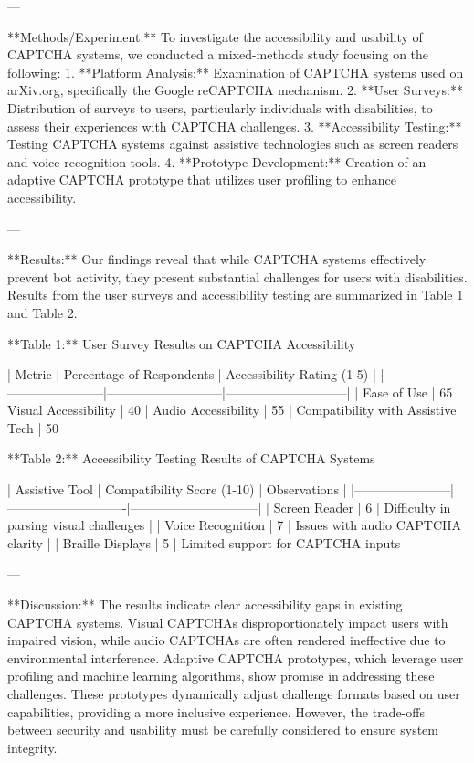---

**Methods/Experiment:**  
To investigate the accessibility and usability of CAPTCHA systems, we conducted a mixed-methods study focusing on the following:  
1. **Platform Analysis:** Examination of CAPTCHA systems used on arXiv.org, specifically the Google reCAPTCHA mechanism.  
2. **User Surveys:** Distribution of surveys to users, particularly individuals with disabilities, to assess their experiences with CAPTCHA challenges.  
3. **Accessibility Testing:** Testing CAPTCHA systems against assistive technologies such as screen readers and voice recognition tools.  
4. **Prototype Development:** Creation of an adaptive CAPTCHA prototype that utilizes user profiling to enhance accessibility.

---

**Results:**  
Our findings reveal that while CAPTCHA systems effectively prevent bot activity, they present substantial challenges for users with disabilities. Results from the user surveys and accessibility testing are summarized in Table 1 and Table 2.

**Table 1:** User Survey Results on CAPTCHA Accessibility  

| Metric                | Percentage of Respondents | Accessibility Rating (1-5) |  
|-----------------------|---------------------------|-----------------------------|  
| Ease of Use           | 65%
| Visual Accessibility  | 40%
| Audio Accessibility   | 55%
| Compatibility with Assistive Tech | 50%

**Table 2:** Accessibility Testing Results of CAPTCHA Systems  

| Assistive Tool        | Compatibility Score (1-10) | Observations                  |  
|-----------------------|----------------------------|------------------------------|  
| Screen Reader         | 6                          | Difficulty in parsing visual challenges |  
| Voice Recognition     | 7                          | Issues with audio CAPTCHA clarity       |  
| Braille Displays      | 5                          | Limited support for CAPTCHA inputs      |  

---

**Discussion:**  
The results indicate clear accessibility gaps in existing CAPTCHA systems. Visual CAPTCHAs disproportionately impact users with impaired vision, while audio CAPTCHAs are often rendered ineffective due to environmental interference. Adaptive CAPTCHA prototypes, which leverage user profiling and machine learning algorithms, show promise in addressing these challenges. These prototypes dynamically adjust challenge formats based on user capabilities, providing a more inclusive experience. However, the trade-offs between security and usability must be carefully considered to ensure system integrity.

